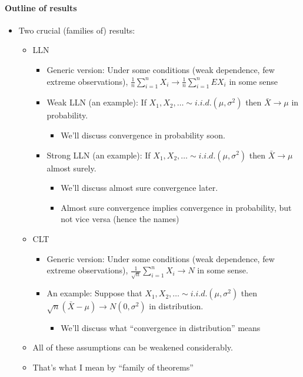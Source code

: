 \paragraph{Outline of results}
\begin{itemize}
\item Two crucial (families of) results:
\begin{itemize}
\item LLN
\begin{itemize}
\item Generic version: Under some conditions (weak dependence, few
           extreme observations), 
           $\frac{1}{n} \sum_{i=1}^n X_i \to \frac{1}{n} \sum_{i=1}^n E X_i$
           in some sense
\item Weak LLN (an example): If $X_1,X_2,\dots \sim i.i.d. (\mu,
           \sigma^2)$ then $\bar X \to \mu$ in probability.
\begin{itemize}
\item We'll discuss convergence in probability soon.
\end{itemize}
\item Strong LLN (an example): If $X_1,X_2,\dots \sim i.i.d. (\mu,
           \sigma^2)$ then $\bar X \to \mu$ almost surely.
\begin{itemize}
\item We'll discuss almost sure convergence later.
\item Almost sure convergence implies convergence in
             probability, but not vice versa (hence the names)
\end{itemize}
\end{itemize}
\item CLT
\begin{itemize}
\item Generic version: Under some conditions (weak dependence, few
           extreme observations), $\frac{1}{\sqrt{n}} \sum_{i=1}^n X_i
           \to N$ in some sense.
\item An example: Suppose that $X_1, X_2, \dots \sim i.i.d. (\mu, \sigma^2)$
           then $\sqrt{n}(\bar X - \mu) \to N(0, \sigma^2)$ in distribution.
\begin{itemize}
\item We'll discuss what ``convergence in distribution'' means
\end{itemize}
\end{itemize}
\item All of these assumptions can be weakened considerably.
\item That's what I mean by ``family of theorems''
\end{itemize}
\end{itemize}

